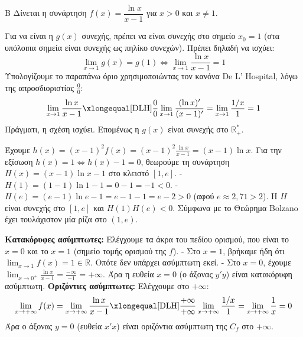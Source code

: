 \begin{thema}{Β}
Δίνεται η συνάρτηση $f(x) = \dfrac{\ln x}{x-1}$ για $x > 0$ και $x \ne 1$.
\begin{erwthma}
\item Για να είναι η $g(x)$ συνεχής, πρέπει να είναι συνεχής στο σημείο $x_0 = 1$ (στα υπόλοιπα σημεία είναι συνεχής ως πηλίκο συνεχών). Πρέπει δηλαδή να ισχύει:
\[ \lim_{x\to1} g(x) = g(1) \Leftrightarrow \lim_{x\to1} \frac{\ln x}{x-1} = 1 \]
Υπολογίζουμε το παραπάνω όριο χρησιμοποιώντας τον κανόνα De L' Hospital, λόγω της απροσδιοριστίας $\frac{0}{0}$:
\[ \lim_{x\to1} \frac{\ln x}{x-1} \xlongequal[\text{DLH}]{\frac{0}{0}} \lim_{x\to1} \frac{(\ln x)'}{(x-1)'} = \lim_{x\to1} \frac{1/x}{1} = 1 \]
Πράγματι, η σχέση ισχύει. Επομένως η $g(x)$ είναι συνεχής στο $\mathbb{R}^*_+$.

\item Έχουμε $h(x) = (x-1)^2 f(x) = (x-1)^2 \frac{\ln x}{x-1} = (x-1)\ln x$.
Για την εξίσωση $h(x) = 1 \Leftrightarrow h(x) - 1 = 0$, θεωρούμε τη συνάρτηση $H(x) = (x-1)\ln x - 1$ στο κλειστό $[1, e]$.
- $H(1) = (1-1)\ln 1 - 1 = 0 - 1 = -1 < 0$.
- $H(e) = (e-1)\ln e - 1 = e - 1 - 1 = e - 2 > 0$ (αφού $e \approx 2,71 > 2$).
Η $H$ είναι συνεχής στο $[1, e]$ και $H(1)H(e) < 0$. Σύμφωνα με το Θεώρημα Bolzano έχει τουλάχιστον μία ρίζα στο $(1, e)$.

\item \textbf{Κατακόρυφες ασύμπτωτες:} Ελέγχουμε τα άκρα του πεδίου ορισμού, που είναι το $x=0$ και το $x=1$ (σημείο τομής ορισμού της $f$).
- Στο $x=1$, βρήκαμε ήδη ότι $\lim_{x\to1} f(x) = 1 \in \mathbb{R}$. Οπότε δεν υπάρχει ασύμπτωτη εκεί.
- Στο $x=0$, έχουμε $\lim_{x\to0^+} \frac{\ln x}{x-1} = \frac{-\infty}{-1} = +\infty$. Άρα η ευθεία $x=0$ (ο άξονας $y'y$) είναι κατακόρυφη ασύμπτωτη.
\textbf{Οριζόντιες ασύμπτωτες:} Ελέγχουμε στο $+\infty$:
\[ \lim_{x\to+\infty} f(x) = \lim_{x\to+\infty} \frac{\ln x}{x-1} \xlongequal[\text{DLH}]{\frac{+\infty}{+\infty}} \lim_{x\to+\infty} \frac{1/x}{1} = \lim_{x\to+\infty} \frac{1}{x} = 0 \]
Άρα ο άξονας $y=0$ (ευθεία $x'x$) είναι οριζόντια ασύμπτωτη της $C_f$ στο $+\infty$.
\end{erwthma}
\end{thema}

